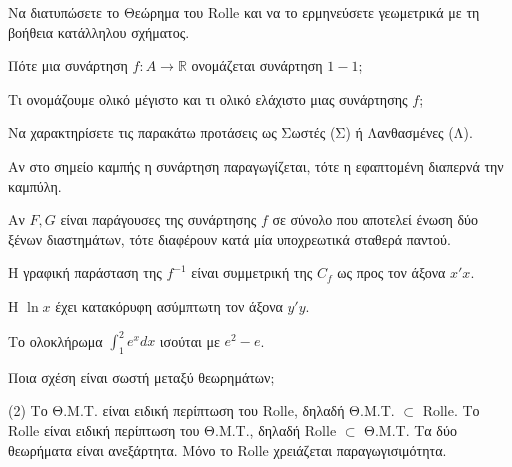 \documentclass[11pt,a4paper]{article}
\newcommand{\kerkissans}[1]{{\fontfamily{maksf}\selectfont \textbf{#1}}}
\renewcommand{\textdexiakeraia}{}
\newcommand{\dint}{\displaystyle\int}
\newcommand\themanum{A}
\newcounter{thema}[section]
\renewcommand{\thethema}{\arabic{thema}}
\newcommand{\Thema}{\refstepcounter{thema}{\textbf{\textcolor{black}{\faPenSquare\ \  \large \kerkissans{\textbf{\thethemaο\hspace{2mm}Διαγώνισμα - Θέμα \themanum}}}}}\hspace{0mm}}{}
\newenvironment{thema}[1]
{\begin{tcolorbox}[title=\Thema\kerkissans{\textbf{\large{  #1}}},breakable,
enhanced standard,titlerule=0pt,toprule=0pt, rightrule=0pt, bottomrule=0pt,
colback=white,left=0mm,top=1mm,bottom=0mm,
boxrule=0pt,
colframe=white,leftrule=0mm,sharp corners,coltitle=black]
\renewcommand{\themanum}{#1}}
{\end{tcolorbox}}
\begin{document}
\begin{thema}{A}
\begin{erwthma}
    \item Να διατυπώσετε το Θεώρημα του Rolle και να το ερμηνεύσετε γεωμετρικά με τη βοήθεια κατάλληλου σχήματος.
    \item Πότε μια συνάρτηση $f:A\to\mathbb{R}$ ονομάζεται συνάρτηση $1-1$;
    \item Τι ονομάζουμε ολικό μέγιστο και τι ολικό ελάχιστο μιας συνάρτησης $f$;
    \item Να χαρακτηρίσετε τις παρακάτω προτάσεις ως Σωστές (Σ) ή Λανθασμένες (Λ).
    \begin{alist}
        \item Αν στο σημείο καμπής η συνάρτηση παραγωγίζεται, τότε η εφαπτομένη διαπερνά την καμπύλη.
        \item Αν $F, G$ είναι παράγουσες της συνάρτησης $f$ σε σύνολο που αποτελεί ένωση δύο ξένων διαστημάτων, τότε διαφέρουν κατά μία υποχρεωτικά σταθερά παντού.
        \item Η γραφική παράσταση της $f^{-1}$ είναι συμμετρική της $C_f$ ως προς τον άξονα $x'x$.
        \item H $\ln x$ έχει κατακόρυφη ασύμπτωτη τον άξονα $y'y$.
        \item Το ολοκλήρωμα $\dint_1^2 e^x dx $ ισούται με $ e^2 - e$.
    \end{alist}
    \item Ποια σχέση είναι σωστή μεταξύ θεωρημάτων;
    \begin{tasks}[label=\let\textdexiakeraia\relax\alph*.](2)
        \task Το Θ.Μ.Τ. είναι ειδική περίπτωση του Rolle, δηλαδή Θ.Μ.Τ. $\subset$ Rolle.
        \task Το Rolle είναι ειδική περίπτωση του Θ.Μ.Τ., δηλαδή Rolle $\subset$ Θ.Μ.Τ.
        \task Τα δύο θεωρήματα είναι ανεξάρτητα.
        \task Μόνο το Rolle χρειάζεται παραγωγισιμότητα.
    \end{tasks}
\end{erwthma}
\end{thema}
\vspace{1cm}
\end{document}
